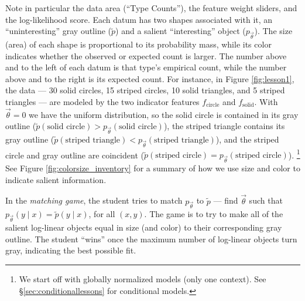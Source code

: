 \documentclass[11pt,letterpaper]{article}
\newcommand{\Note}[1]{}
\renewcommand{\Note}[1]{\hl{[#1]}}
\newcommand{\NoteSigned}[3]{{\sethlcolor{#2}\Note{#1: #3}}}
\newcommand{\NoteJE}[1]{\NoteSigned{JE}{LightGreen}{#1}}
\newcommand{\Commented}[1]{}
\newcommand{\empirical}[0]{\ensuremath{\tilde{p}}}
\begin{document}
\Commented{\NoteJE{I'd
  lead with this.  In fact, I think the text shown in Fig. 1 is
  extremely helpful for the reader to understand what this
  manipulative is all about, which is so far rather obscure even
  though we're well into the paper by now.  Maybe encourage the reader
  explicitly to read Fig. 1, and maybe enlarge it a bit (although the
  reader can zoom in if they're reading onscreen).  In the final
  version, you might be able to get a higher-res screenshot by zooming
  the browser (and using an appropriately large window); this gives a
  larger image and larger-font text, which you can shrink back again
  in the PDF.}  }
Note in particular the data area (``Type Counts''), the
feature weight sliders, and the log-likelihood score. 
Each datum has two shapes associated with it, an
``uninteresting'' gray outline ($\empirical{}$) and a salient
``interesting'' object ($p_{\vec{\theta}}$). The size (area) of
each shape is proportional to its probability mass, while its color
indicates whether the observed or expected count is larger.  The
number above and to the left of each datum is that type's empirical
count, while the number above and to the right is its expected count.
For instance, in Figure \ref{fig:lesson1}, the data --- 30 solid
circles, 15 striped circles, 10 solid triangles, and 5 striped
triangles --- are modeled by the two indicator features
$f_{\textrm{circle}}$ and $f_{\textrm{solid}}$. With $\vec{\theta} =
0$ we have the uniform distribution, so the solid circle is contained
in its gray outline ($\empirical{}(\textrm{solid circle}) >
p_{\vec{\theta}}(\textrm{solid circle})$), the striped triangle
contains its gray outline ($\empirical{}(\textrm{striped triangle}) <
p_{\vec{\theta}}(\textrm{striped triangle})$), and the striped
circle and gray outline are coincident ($\empirical{}(\textrm{striped
  circle}) = p_{\vec{\theta}}(\textrm{striped circle})$).
\footnote{We start off with globally normalized models (only one 
context). See \S\ref{sec:conditionallessons} for conditional models.}  
See Figure \ref{fig:colorsize_inventory}
for a summary of how we use size and color to indicate salient
information.

In the \textit{matching game}, the student tries to match $p_{\vec{\theta}}$ to 
$\tilde{p}$ --- find $\vec{\theta}$ such that $p_{\vec{\theta}}(y\mid x) 
= \tilde{p}(y\mid x)$, for all $(x,y)$. The game is to try to make all of the salient log-linear objects 
equal in size (and color) to their corresponding gray outline. The student ``wins'' once the maximum
number of log-linear objects turn gray, indicating the best possible fit.
\end{document}
